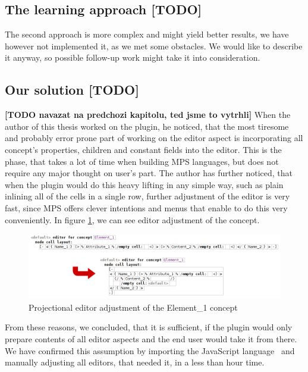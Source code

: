 \subsection{The learning approach [TODO]}

The second approach is more complex and might yield better results, we have however not implemented it, as we met some obstacles.
We would like to describe it anyway, so possible follow-up work might take it into consideration.

\subsection{Our solution [TODO]}
\label{chap:editor_solution}

\textbf{[TODO navazat na predchozi kapitolu, ted jsme to vytrhli]}
When the author of this thesis worked on the plugin, he noticed, that the most tiresome and probably error prone part of working on the editor aspect is incorporating all concept's properties, children and constant fields into the editor.
This is the phase, that takes a lot of time when building MPS languages, but does not require any major thought on user's part.
The author has further noticed, that when the plugin would do this heavy lifting in any simple way, such as plain inlining all of the cells in a single row, further adjustment of the editor is very fast, since MPS offers clever intentions and menus that enable to do this very conveniently.
In figure \ref{fig:editor_adjustment}, we can see editor adjustment of the  concept.
\\

\begin{figure}[h]
	\centering
	\includegraphics[width=\textwidth]{./img/editor_adjustment.png}
	\caption{Projectional editor adjustment of the Element{\_}1 concept}
	\label{fig:editor_adjustment}
\end{figure}

From these reasons, we concluded, that it is sufficient, if the plugin would only prepare contents of all editor aspects and the end user would take it from there.
We have confirmed this assumption by importing the JavaScript language~\cite{javascript} and manually adjusting all editors, that needed it, in a less than hour time.

